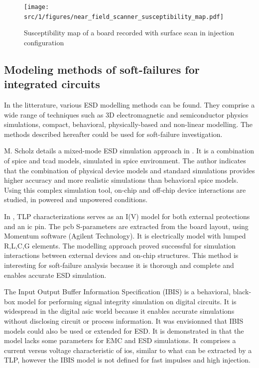 \begin{figure}[!h]
  \centering
  \texttt{[image: src/1/figures/near\_field\_scanner\_susceptibility\_map.pdf]}
  \caption{Susceptibility map of a board recorded with surface scan in injection configuration \cite{}}
  \label{fig:near-field-scan-map}
\end{figure}


\subsection{Modeling methods of soft-failures for integrated circuits}

In the litterature, various ESD modelling methods can be found.
They comprise a wide range of techniques such as 3D electromagnetic and semiconductor physics simulations, compact, behavioral, physically-based and non-linear modelling.
The methods described hereafter could be used for soft-failure investigation.

M. Scholz details a mixed-mode ESD simulation approach in \cite{mixedModeESDSims}.
It is a combination of \gls{spice} and \gls{tcad} models, simulated in \gls{spice} environment.
The author indicates that the combination of physical device models and standard simulations provides higher accuracy and more realistic simulations than behavioral \gls{spice} models.
Using this complex simulation tool, on-chip and off-chip device interactions are studied, in powered and unpowered conditions.

In \cite{usb2ESDProtection}, TLP characterizations serves as an I(V) model for both external protections and an \gls{ic} pin.
The \gls{pcb} S-parameters are extracted from the board layout, using Momentum software (Agilent Technology).
It is electrically model with lumped R,L,C,G elements.
The modelling approach proved successful for simulation interactions between external devices and on-chip structures.
This method is interesting for soft-failure analysis because it is thorough and complete and enables accurate ESD simulation.

The Input Output Buffer Information Specification (IBIS) \cite{ibis-spec} is a behavioral, black-box model for performing signal integrity simulation on digital circuits.
It is widespread in the digital \gls{asic} world because it enables accurate simulations without disclosing circuit or process information.
It was envisionned that IBIS models could also be used or extended for ESD.
It is demonstrated in \cite{ibisImprovementFabrice} that the model lacks some parameters for EMC and ESD simulations.
It comprises a current versus voltage characteristic of \gls{io}s, similar to what can be extracted by a TLP, however the IBIS model is not defined for fast impulses and high injection.

